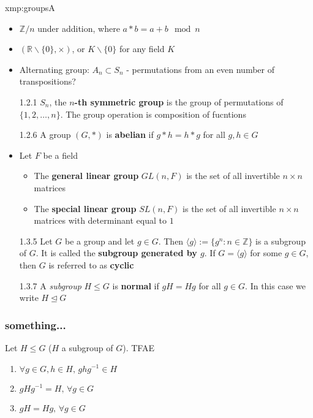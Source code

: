 \documentclass{article}
\begin{document}
\begin{xmp}{xmp:groups}{A}
    \begin{itemize}
        \item $\mathbb{Z} / n$ under addition, where $a * b = a + b \mod n$
        \item $(\mathbb{R} \backslash \{0\}, \times)$, or $K \backslash \{0\}$ for any field $K$
        \item Alternating group: $A_{n} \subset S_{n}$ - permutations from an even number of transpositions?
        \item[1.2.1] $S_{n}$, the \textbf{$n$-th symmetric group} is the group of permutations of $\{1,2,\dots,n\}$. The group operation is composition of fucntions
        \item[1.2.6] A group $(G, *)$ is \textbf{abelian} if $g * h = h * g$ for all $g, h\in G$
        \item Let $F$ be a field
            \begin{itemize}
                \item The \textbf{general linear group} $GL(n, F)$ is the set of all invertible $n \times n$ matrices
                \item The \textbf{special linear group} $SL (n, F)$ is the set of all invertible $n \times n$ matrices with determinant equal to $1$
            \end{itemize}
        \item[1.3.5] Let $G$ be a group and let $g\in G$. Then $\langle g \rangle := \{g^{n} : n\in \mathbb{Z}\}$ is a subgroup of $G$. It is called the \textbf{subgroup generated by $g$}. If $G = \langle g \rangle$ for some $g\in G$, then $G$ is referred to as \textbf{cyclic}
        \item[1.3.7] A \textit{subgroup} $H \le G$ is \textbf{normal} if $gH = Hg$ for all $g\in G$. In this case we write $H \unlhd G$
    \end{itemize}
\end{xmp}

\subsubsection{something...}
Let $H \le G$ ($H$ a subgroup of $G$). TFAE
\begin{enumerate}
    \item $\forall g\in G, h\in H,\, ghg^{-1}\in H$ 
    \item $gHg^{-1} = H,\,\forall g\in G$
    \item $gH = Hg,\, \forall g\in G$
\end{enumerate}
\end{document}

